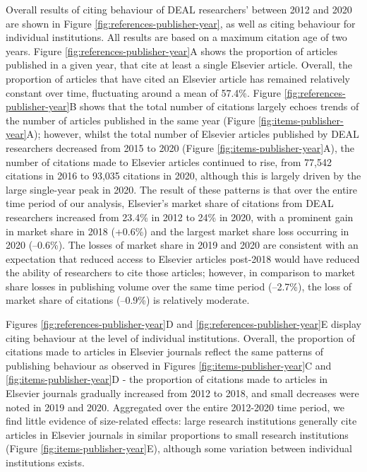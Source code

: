 \documentclass[
]{article}
\begin{document}
Overall results of citing behaviour of DEAL researchers' between 2012 and 2020 are shown in Figure \ref{fig:references-publisher-year}, as well as citing behaviour for individual institutions. All results are based on a maximum citation age of two years. Figure \ref{fig:references-publisher-year}A shows the proportion of articles published in a given year, that cite at least a single Elsevier article. Overall, the proportion of articles that have cited an Elsevier article has remained relatively constant over time, fluctuating around a mean of 57.4\%. Figure \ref{fig:references-publisher-year}B shows that the total number of citations largely echoes trends of the number of articles published in the same year (Figure \ref{fig:items-publisher-year}A); however, whilst the total number of Elsevier articles published by DEAL researchers decreased from 2015 to 2020 (Figure \ref{fig:items-publisher-year}A), the number of citations made to Elsevier articles continued to rise, from 77,542 citations in 2016 to 93,035 citations in 2020, although this is largely driven by the large single-year peak in 2020. The result of these patterns is that over the entire time period of our analysis, Elsevier's market share of citations from DEAL researchers increased from 23.4\% in 2012 to 24\% in 2020, with a prominent gain in market share in 2018 (+0.6\%) and the largest market share loss occurring in 2020 (--0.6\%). The losses of market share in 2019 and 2020 are consistent with an expectation that reduced access to Elsevier articles post-2018 would have reduced the ability of researchers to cite those articles; however, in comparison to market share losses in publishing volume over the same time period (--2.7\%), the loss of market share of citations (--0.9\%) is relatively moderate.

Figures \ref{fig:references-publisher-year}D and \ref{fig:references-publisher-year}E display citing behaviour at the level of individual institutions. Overall, the proportion of citations made to articles in Elsevier journals reflect the same patterns of publishing behaviour as observed in Figures \ref{fig:items-publisher-year}C and \ref{fig:items-publisher-year}D - the proportion of citations made to articles in Elsevier journals gradually increased from 2012 to 2018, and small decreases were noted in 2019 and 2020. Aggregated over the entire 2012-2020 time period, we find little evidence of size-related effects: large research institutions generally cite articles in Elsevier journals in similar proportions to small research institutions (Figure \ref{fig:items-publisher-year}E), although some variation between individual institutions exists.
\end{document}
